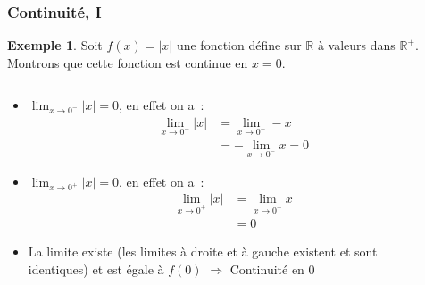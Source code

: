 \documentclass[10pt,notheorems]{beamer}
\theoremstyle{plain}
\theoremstyle{definition} %
\newtheorem{example}{Exemple}
\begin{document}
\begin{frame}
  \frametitle{Continuité, I}

  \begin{example}

    Soit $f(x) = |x|$ une fonction défine sur $\mathbb R$ à valeurs dans $\mathbb R^+$. Montrons que cette fonction est continue en $x=0$.\newline

    \begin{columns}[onlytextwidth]
      \begin{column}{.5\textwidth}
        {\small
          \begin{itemize}
          \item $\lim_{x\rightarrow 0^-} |x| = 0$, en effet on a~:
            \[
              \begin{split}
                \lim_{x\rightarrow 0^-} |x| &= \lim_{x\rightarrow 0^-} -x\\
                &= -\lim_{x\rightarrow 0^-} x = 0
              \end{split}
            \]
          \item $\lim_{x\rightarrow 0^+} |x| = 0$, en effet on a~:
            \[
              \begin{split}
                \lim_{x\rightarrow 0^+} |x| &= \lim_{x\rightarrow 0^+} x\\
                &= 0
              \end{split}
            \]
          \item La limite existe (les limites à droite et à gauche existent et sont identiques) et est égale à $f(0)$ $\Rightarrow$ Continuité en 0
          \end{itemize}}
      \end{column}
      \begin{column}{.5\textwidth}
      \end{column}
    \end{columns}
  \end{example}

\end{frame}
\end{document}
